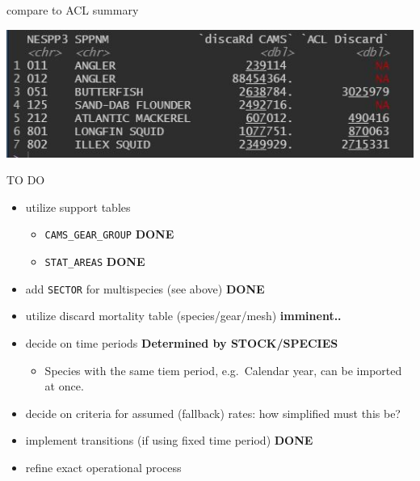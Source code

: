 \documentclass[
  ignorenonframetext,
]{beamer}
\providecommand{\tightlist}{%
  \setlength{\itemsep}{0pt}\setlength{\parskip}{0pt}}
\begin{document}
\begin{frame}{compare to ACL summary}
\protect\hypertarget{compare-to-acl-summary}{}

\includegraphics[width = \textwidth]{CAMS_discaRd_ACL_comparison.jpg}

\end{frame}

\begin{frame}[fragile]{TO DO}
\protect\hypertarget{to-do}{}

\begin{itemize}
\tightlist
\item
  utilize support tables

  \begin{itemize}
  \tightlist
  \item
    \texttt{CAMS\_GEAR\_GROUP} \textbf{DONE}
  \item
    \texttt{STAT\_AREAS} \textbf{DONE}
  \end{itemize}
\item
  add \texttt{SECTOR} for multispecies (see above) \textbf{DONE}
\item
  utilize discard mortality table (species/gear/mesh)
  \textbf{imminent..}
\item
  decide on time periods \textbf{Determined by STOCK/SPECIES}

  \begin{itemize}
  \tightlist
  \item
    Species with the same tiem period, e.g.~Calendar year, can be
    imported at once.
  \end{itemize}
\item
  decide on criteria for assumed (fallback) rates: how simplified must
  this be?
\item
  implement transitions (if using fixed time period) \textbf{DONE}
\item
  refine exact operational process
\end{itemize}

\end{frame}
\end{document}
